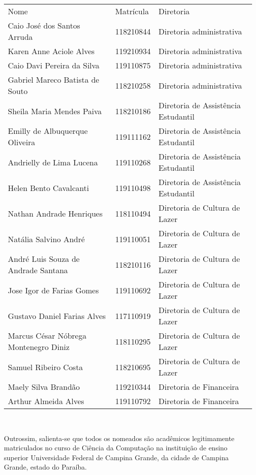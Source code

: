 \documentclass[10pt,letterpaper]{article}
\begin{document}
\begin{center}
\begin{tabular}{|l|l|l|}
\hline
Nome & Matrícula & Diretoria \\
Caio José dos Santos Arruda & 118210844 & Diretoria administrativa \\
Karen Anne Aciole Alves & 119210934 & Diretoria administrativa \\
Caio Davi Pereira da Silva & 119110875 & Diretoria administrativa \\
Gabriel Mareco Batista de Souto & 118210258 & Diretoria administrativa \\
Sheila Maria Mendes Paiva & 118210186 & Diretoria de Assistência Estudantil \\
Emilly de Albuquerque Oliveira & 119111162 & Diretoria de Assistência Estudantil \\
Andrielly de Lima Lucena & 119110268 & Diretoria de Assistência Estudantil \\
Helen Bento Cavalcanti & 119110498 & Diretoria de Assistência Estudantil \\
Nathan Andrade Henriques & 118110494 & Diretoria de Cultura de Lazer \\
Natália Salvino André & 119110051 & Diretoria de Cultura de Lazer \\
André Luis Souza de Andrade Santana & 118210116 & Diretoria de Cultura de Lazer \\
Jose Igor de Farias Gomes & 119110692 & Diretoria de Cultura de Lazer \\
Gustavo Daniel Farias Alves & 117110919 & Diretoria de Cultura de Lazer \\
Marcus César Nóbrega Montenegro Diniz & 118110295 & Diretoria de Cultura de Lazer \\
Samuel Ribeiro Costa & 118210695 & Diretoria de Cultura de Lazer \\
Maely Silva Brandão & 119210344 & Diretoria de Financeira \\
Arthur Almeida Alves & 119110792 & Diretoria de Financeira \\
\hline
\end{tabular}\\
\end{center}

Outrossim, salienta-se que todos os nomeados são acadêmicos legitimamente matriculados no curso de Ciência da Computação na instituição de ensino superior Universidade Federal de Campina Grande, da cidade de Campina Grande, estado do Paraíba. \\
\end{document}
